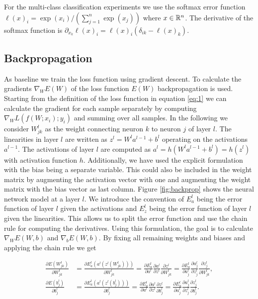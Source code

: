 \documentclass[english,11pt,a4paper]{article}
\begin{document}
For the multi-class classification experiments we use the softmax error function $\ell(x)_i = \exp(x_i)/(\sum_{j=1}^{n} \exp(x_j))$ where $x \in \mathbb{R}^n$. The derivative of the softmax function is $\partial_{x_k} \ell(x)_i = \ell(x)_i (\delta_{ik} - \ell(x)_k)$.

\subsection{Backpropagation}

As baseline we train the loss function using gradient descent. To calculate the gradients $\nabla_{W}E(W)$ of the loss function $E(W)$ backpropagation is used. Starting from the definition of the loss function in equation \ref{eq:1} we can calculate the gradient for each sample separately by computing $\nabla_{W}L(f(W;x_i);y_i)$ and summing over all samples. In the following we consider $W_{jk}^l$ as the weight connecting neuron $k$ to neuron $j$ of layer $l$. The linearities in layer $l$ are written as $z^l = W^la^{l-1} + b^l$ operating on the activations $a^{l-1}$. The activations of layer $l$ are computed as $a^l = h(W^l a^{l-1} + b^l) = h(z^l)$ with activation function $h$. Additionally, we have used the explicit formulation with the bias being a separate variable. This could also be included in the weight matrix by augmenting the activation vector with one and augmenting the weight matrix with the bias vector as last column. Figure \ref{fig:backprop} shows the neural network model at a layer $l$. We introduce the convention of $E^l_a$ being the error function of layer $l$ given the activations and $E^l_z$ being the error function of layer $l$ given the linearities. This allows us to split the error function and use the chain rule for computing the derivatives. Using this formulation, the goal is to calculate $\nabla_{W}E(W,b)$ and $\nabla_{b}E(W,b)$. By fixing all remaining weights and biases and applying the chain rule we get

\begin{equation}
	\begin{aligned}
		\frac{\partial E(W_{jk}^l)}{\partial W_{jk}^l} &= 
		\frac{\partial E^l_a(a^l(z^l(W_{jk}^l)))}{\partial W_{jk}^l} =
		\frac{\partial E^l_a}{\partial a^l} \frac{\partial a^l}{\partial z^l} \frac{\partial z^l}{\partial W^l_{jk}} =
		\frac{\partial E^l_a}{\partial a^l_j} \frac{\partial a^l_j}{\partial z^l_j} \frac{\partial z^l_j}{\partial W^l_{jk}}, \\
		\frac{\partial E(b_j^l)}{\partial b_j^l} &=
		\frac{\partial E^l_a(a^l(z^l(b_j^l)))}{\partial b_j^l} =
		\frac{\partial E^l_a}{\partial a^l} \frac{\partial a^l}{\partial z^l} \frac{\partial z^l}{\partial b_j^l} =
		\frac{\partial E^l_a}{\partial a^l_j} \frac{\partial a^l_j}{\partial z^l_j} \frac{\partial z^l_j}{\partial b_j^l}.
	\end{aligned}
	\label{eq:backprop_chainrule}
\end{equation}
\end{document}
